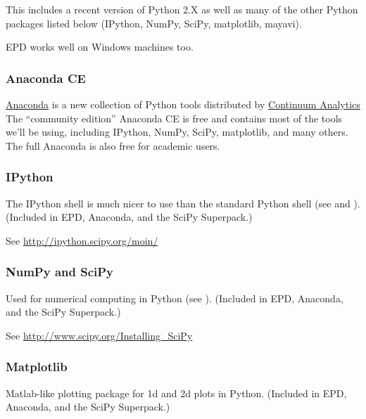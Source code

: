 \documentclass[letterpaper,10pt,english]{sphinxmanual}
\begin{document}
This includes a recent version of Python 2.X as well as many of the other
Python packages listed below (IPython, NumPy, SciPy, matplotlib, mayavi).

EPD works well on Windows machines too.


\subsubsection{Anaconda CE}
\label{software_installation:installing-anaconda}\label{software_installation:anaconda-ce}
\href{https://store.continuum.io/cshop/anaconda}{Anaconda}
is a new collection of Python tools distributed by
\href{http://www.continuum.io/index.html}{Continuum Analytics}
The ``community edition'' Anaconda CE is free and contains most of the tools
we'll be using, including IPython, NumPy, SciPy, matplotlib,
and many others.  The full Anaconda is also free for academic users.


\subsubsection{IPython}
\label{software_installation:ipython}\label{software_installation:installing-ipython}
The IPython shell is much nicer to use than the standard Python shell (see
{\hyperref[shells:shells]{}} and ).
(Included in EPD, Anaconda, and the SciPy Superpack.)

See \url{http://ipython.scipy.org/moin/}


\subsubsection{NumPy and SciPy}
\label{software_installation:installing-numpy}\label{software_installation:numpy-and-scipy}
Used for numerical computing in Python (see {\hyperref[numerical_python:numerical\string-python]{}}).
(Included in EPD, Anaconda, and the SciPy Superpack.)

See \url{http://www.scipy.org/Installing\_SciPy}


\subsubsection{Matplotlib}
\label{software_installation:matplotlib}
Matlab-like plotting package for 1d and 2d plots in Python.
(Included in EPD, Anaconda, and the SciPy Superpack.)
\end{document}
